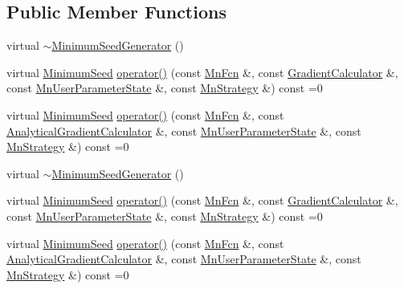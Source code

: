 \subsection*{Public Member Functions}
\begin{DoxyCompactItemize}
\item 
virtual \mbox{\hyperlink{classROOT_1_1Minuit2_1_1MinimumSeedGenerator_a8dba99d17a2ee712dfd6d602c80ec423}{$\sim$\+Minimum\+Seed\+Generator}} ()
\item 
virtual \mbox{\hyperlink{classROOT_1_1Minuit2_1_1MinimumSeed}{Minimum\+Seed}} \mbox{\hyperlink{classROOT_1_1Minuit2_1_1MinimumSeedGenerator_ae71de52027d3f0c7fa202c7cf65b947a}{operator()}} (const \mbox{\hyperlink{classROOT_1_1Minuit2_1_1MnFcn}{Mn\+Fcn}} \&, const \mbox{\hyperlink{classROOT_1_1Minuit2_1_1GradientCalculator}{Gradient\+Calculator}} \&, const \mbox{\hyperlink{classROOT_1_1Minuit2_1_1MnUserParameterState}{Mn\+User\+Parameter\+State}} \&, const \mbox{\hyperlink{classROOT_1_1Minuit2_1_1MnStrategy}{Mn\+Strategy}} \&) const =0
\item 
virtual \mbox{\hyperlink{classROOT_1_1Minuit2_1_1MinimumSeed}{Minimum\+Seed}} \mbox{\hyperlink{classROOT_1_1Minuit2_1_1MinimumSeedGenerator_a670b9671c73d7e0d3caa148e82d4b2fa}{operator()}} (const \mbox{\hyperlink{classROOT_1_1Minuit2_1_1MnFcn}{Mn\+Fcn}} \&, const \mbox{\hyperlink{classROOT_1_1Minuit2_1_1AnalyticalGradientCalculator}{Analytical\+Gradient\+Calculator}} \&, const \mbox{\hyperlink{classROOT_1_1Minuit2_1_1MnUserParameterState}{Mn\+User\+Parameter\+State}} \&, const \mbox{\hyperlink{classROOT_1_1Minuit2_1_1MnStrategy}{Mn\+Strategy}} \&) const =0
\item 
virtual \mbox{\hyperlink{classROOT_1_1Minuit2_1_1MinimumSeedGenerator_a8dba99d17a2ee712dfd6d602c80ec423}{$\sim$\+Minimum\+Seed\+Generator}} ()
\item 
virtual \mbox{\hyperlink{classROOT_1_1Minuit2_1_1MinimumSeed}{Minimum\+Seed}} \mbox{\hyperlink{classROOT_1_1Minuit2_1_1MinimumSeedGenerator_ae71de52027d3f0c7fa202c7cf65b947a}{operator()}} (const \mbox{\hyperlink{classROOT_1_1Minuit2_1_1MnFcn}{Mn\+Fcn}} \&, const \mbox{\hyperlink{classROOT_1_1Minuit2_1_1GradientCalculator}{Gradient\+Calculator}} \&, const \mbox{\hyperlink{classROOT_1_1Minuit2_1_1MnUserParameterState}{Mn\+User\+Parameter\+State}} \&, const \mbox{\hyperlink{classROOT_1_1Minuit2_1_1MnStrategy}{Mn\+Strategy}} \&) const =0
\item 
virtual \mbox{\hyperlink{classROOT_1_1Minuit2_1_1MinimumSeed}{Minimum\+Seed}} \mbox{\hyperlink{classROOT_1_1Minuit2_1_1MinimumSeedGenerator_a670b9671c73d7e0d3caa148e82d4b2fa}{operator()}} (const \mbox{\hyperlink{classROOT_1_1Minuit2_1_1MnFcn}{Mn\+Fcn}} \&, const \mbox{\hyperlink{classROOT_1_1Minuit2_1_1AnalyticalGradientCalculator}{Analytical\+Gradient\+Calculator}} \&, const \mbox{\hyperlink{classROOT_1_1Minuit2_1_1MnUserParameterState}{Mn\+User\+Parameter\+State}} \&, const \mbox{\hyperlink{classROOT_1_1Minuit2_1_1MnStrategy}{Mn\+Strategy}} \&) const =0

\end{DoxyCompactItemize}
